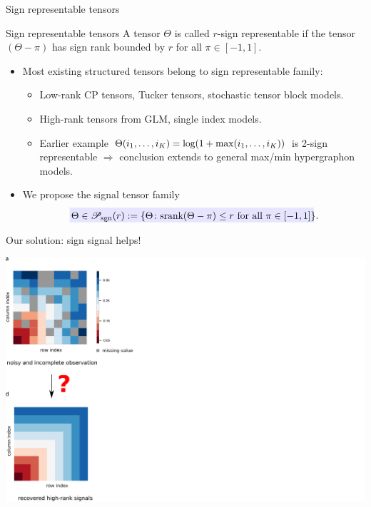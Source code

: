 \documentclass[10pt, mathserif]{beamer} %
\theoremstyle{definition}
\theoremstyle{plain}
\def\caliP{\mathscr{P}_{\textup{sgn}}}
\def\caliP{\mathscr{P}_{\textup{sgn}}}
\begin{document}
\begin{frame}{Sign representable tensors}
    \begin{block}{Sign representable tensors} 
A tensor $\Theta$ is called {\color{red}$r$-sign representable} if the tensor $(\Theta-\pi)$ has sign rank bounded by $r$ for all $\pi\in[-1,1].$ 
    \end{block}
    \begin{itemize}
   \item Most existing structured tensors belong to sign representable family:
    \begin{itemize}
      \item {\color{red}Low-rank} CP tensors, Tucker tensors, stochastic tensor block models.
       \item {\color{red}High-rank} tensors from GLM, single index models. 
        \item Earlier example $\small \Theta(i_1,\ldots,i_K) = \log(1+\max(i_1,\ldots,i_K))$ is 2-sign representable $\Rightarrow$ conclusion extends to general max/min hypergraphon models. 
    \end{itemize} 
    
       \item We propose the signal tensor family
       \begin{align}
         \rlap{\textcolor{blue!10}{\rule[-\dp\strutbox]{250pt}{\baselineskip}}}\,  \Theta\in\caliP(r):=\{\Theta\colon\text{srank}(\Theta-\pi)\leq r \text{ for all } \pi\in[-1,1]\}.
       \end{align}
      \end{itemize}
\end{frame}


\begin{frame}{Our solution: sign signal helps!}
 
     \begin{center}
     \includegraphics[width =\textwidth]{Figures/mainidea_step1.pdf}
        \end{center}
   \end{frame}
\end{document}
